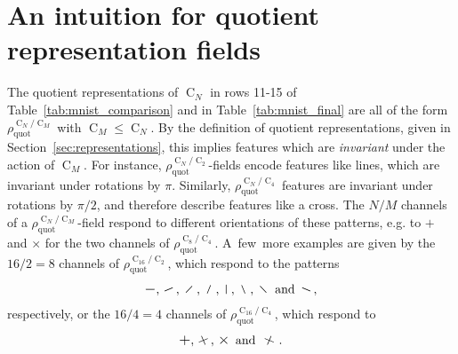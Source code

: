 \documentclass{article}
\newcommand{\C}[1]{\ensuremath{\operatorname{C}_{#1}}}
\newcommand{\CN}{\ensuremath{\operatorname{C}_{\!N}}}
\begin{document}
\section{An intuition for quotient representation fields}
\label{apx:quotient_models}
The quotient representations of $\CN$ in rows 11-15 of Table~\ref{tab:mnist_comparison} and in Table~\ref{tab:mnist_final} are all of the form $\rho_\text{quot}^{\CN\!\!/\!\C{M}}$ with $\C{M}\leq\CN$.
By the definition of quotient representations, given in Section~\ref{sec:representations}, this implies features which are \textit{invariant} under the action of $\C{M}$.
For instance, $\rho_\text{quot}^{\CN\!\!/\!\C2}$-fields encode features like lines, which are invariant under rotations by $\pi$.
Similarly, $\rho_\text{quot}^{\CN\!\!/\!\C4}$ features are invariant under rotations by $\pi/2$, and therefore describe features like a cross.
The $N/M$ channels of a $\rho_\text{quot}^{\CN\!\!/\!\C{M}}$-field respond to different orientations of these patterns, e.g. to $+$ and $\times$ for the two channels of $\rho_\text{quot}^{\C8\!\!/\!\C4}$.
A~few~more examples are given by the $16/2=8$ channels of $\rho_\text{quot}^{\C{16}\!\!/\!\C2}$, which respond to the patterns
$$
\mathbin{\rotatebox[origin=c]{  0  }{$\scaleobj{1.2}{-}$}},
\mathbin{\rotatebox[origin=c]{ 22.5}{$\scaleobj{1.2}{-}$}},
\mathbin{\rotatebox[origin=c]{ 45  }{$\scaleobj{1.2}{-}$}},
\mathbin{\rotatebox[origin=c]{ 67.5}{$\scaleobj{1.2}{-}$}},
\mathbin{\rotatebox[origin=c]{ 90  }{$\scaleobj{1.2}{-}$}},
\mathbin{\rotatebox[origin=c]{112.5}{$\scaleobj{1.2}{-}$}},
\mathbin{\rotatebox[origin=c]{135  }{$\scaleobj{1.2}{-}$}}\ \text{and}\ 
\mathbin{\rotatebox[origin=c]{157.5}{$\scaleobj{1.2}{-}$}},
$$
respectively, or the $16/4=4$ channels of $\rho_\text{quot}^{\C{16}\!\!/\!\C4}$, which respond to
$$
\mathbin{\rotatebox[origin=c]{  0  }{$\scaleobj{1.2}{+}$}},
\mathbin{\rotatebox[origin=c]{ 22.5}{$\scaleobj{1.2}{+}$}},
\mathbin{\rotatebox[origin=c]{ 45  }{$\scaleobj{1.2}{+}$}}\ \text{and}\ 
\mathbin{\rotatebox[origin=c]{ 67.5}{$\scaleobj{1.2}{+}$}}.
$$
\end{document}
